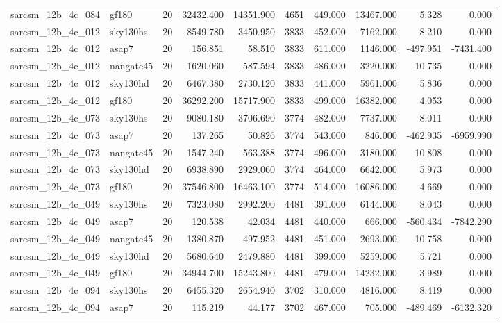 \begin{longtable}{llrrrrrrrr}
sarcsm\_12b\_4c\_084 & gf180 & 20 & 32432.400 & 14351.900 & 4651 & 449.000 & 13467.000 & 5.328 & 0.000 \\
sarcsm\_12b\_4c\_012 & sky130hs & 20 & 8549.780 & 3450.950 & 3833 & 452.000 & 7162.000 & 8.210 & 0.000 \\
sarcsm\_12b\_4c\_012 & asap7 & 20 & 156.851 & 58.510 & 3833 & 611.000 & 1146.000 & -497.951 & -7431.400 \\
sarcsm\_12b\_4c\_012 & nangate45 & 20 & 1620.060 & 587.594 & 3833 & 486.000 & 3220.000 & 10.735 & 0.000 \\
sarcsm\_12b\_4c\_012 & sky130hd & 20 & 6467.380 & 2730.120 & 3833 & 441.000 & 5961.000 & 5.836 & 0.000 \\
sarcsm\_12b\_4c\_012 & gf180 & 20 & 36292.200 & 15717.900 & 3833 & 499.000 & 16382.000 & 4.053 & 0.000 \\
sarcsm\_12b\_4c\_073 & sky130hs & 20 & 9080.180 & 3706.690 & 3774 & 482.000 & 7737.000 & 8.011 & 0.000 \\
sarcsm\_12b\_4c\_073 & asap7 & 20 & 137.265 & 50.826 & 3774 & 543.000 & 846.000 & -462.935 & -6959.990 \\
sarcsm\_12b\_4c\_073 & nangate45 & 20 & 1547.240 & 563.388 & 3774 & 496.000 & 3180.000 & 10.808 & 0.000 \\
sarcsm\_12b\_4c\_073 & sky130hd & 20 & 6938.890 & 2929.060 & 3774 & 464.000 & 6642.000 & 5.973 & 0.000 \\
sarcsm\_12b\_4c\_073 & gf180 & 20 & 37546.800 & 16463.100 & 3774 & 514.000 & 16086.000 & 4.669 & 0.000 \\
sarcsm\_12b\_4c\_049 & sky130hs & 20 & 7323.080 & 2992.200 & 4481 & 391.000 & 6144.000 & 8.043 & 0.000 \\
sarcsm\_12b\_4c\_049 & asap7 & 20 & 120.538 & 42.034 & 4481 & 440.000 & 666.000 & -560.434 & -7842.290 \\
sarcsm\_12b\_4c\_049 & nangate45 & 20 & 1380.870 & 497.952 & 4481 & 451.000 & 2693.000 & 10.758 & 0.000 \\
sarcsm\_12b\_4c\_049 & sky130hd & 20 & 5680.640 & 2479.880 & 4481 & 399.000 & 5259.000 & 5.721 & 0.000 \\
sarcsm\_12b\_4c\_049 & gf180 & 20 & 34944.700 & 15243.800 & 4481 & 479.000 & 14232.000 & 3.989 & 0.000 \\
sarcsm\_12b\_4c\_094 & sky130hs & 20 & 6455.320 & 2654.940 & 3702 & 310.000 & 4816.000 & 8.419 & 0.000 \\
sarcsm\_12b\_4c\_094 & asap7 & 20 & 115.219 & 44.177 & 3702 & 467.000 & 705.000 & -489.469 & -6132.320 \\

\end{longtable}
